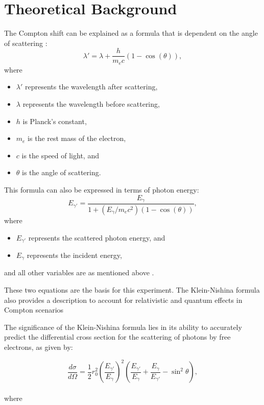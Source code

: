 \documentclass[10pt,letterpaper,onecolumn]{article}
\begin{document}
\section{Theoretical Background}
The Compton shift can be explained as a formula that is dependent on the angle of scattering \cite{PhysRev.21.483}:
\begin{equation}
    \label{comptonShiftWavelength} 
    \lambda' = \lambda + \frac{h}{m_e c}(1 - \cos(\theta)),
\end{equation}
where 
\begin{itemize}
\item $\lambda'$ represents the wavelength after scattering, 
\item $\lambda$ represents the wavelength before scattering, 
\item $h$ is Planck's constant,
\item $m_e$ is the rest mass of the electron,
\item $c$ is the speed of light, and
\item $\theta$ is the angle of scattering.
\end{itemize}
This formula can also be expressed in terms of photon energy:
\begin{equation}
    \label{comptonShiftEnergy} 
    E_{\gamma'} = \frac{E_{\gamma}}{1 + \left( {E_{\gamma}}/{m_e c^2} \right)(1 - \cos(\theta))},
\end{equation}
where 
\begin{itemize}
\item $ E_{\gamma'}$ represents the scattered photon energy, and
\item $E_{\gamma}$ represents the incident energy, 
\end{itemize}
and all other variables are as mentioned above
\cite{Taylor2004ModernPhysics}.


These two equations are the basis for this experiment.
The Klein-Nishina formula also provides a description to account for relativistic and quantum effects in Compton scenarios


The significance of the Klein-Nishina formula lies in its ability to accurately predict the differential cross section for the scattering of photons by free electrons, as given by:

\begin{equation}
\frac{d\sigma}{d\Omega} = \frac{1}{2} r_0^2 \left( \frac{E_{\gamma'}}{E_{\gamma}} \right)^2 \left( \frac{E_{\gamma'}}{E_{\gamma}} + \frac{E_{\gamma}}{E_{\gamma'}} - \sin^2 \theta \right),
\end{equation}
\\
where
\end{document}
